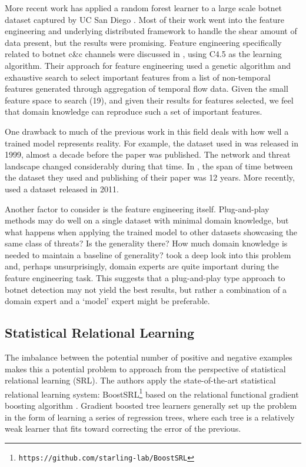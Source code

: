\documentclass[letterpaper]{article}
\begin{document}
More recent work has applied a random forest learner to a large scale botnet dataset captured by UC San Diego \cite{SINGH2014488}.  Most of their work went into the feature engineering and underlying distributed framework to handle the shear amount of data present, but the results were promising.  Feature engineering specifically related to botnet c\&c channels were discussed in \cite{7891834}, using C4.5 as the learning algorithm.  Their approach for feature engineering used a genetic algorithm and exhaustive search to select important features from a list of non-temporal features generated through aggregation of temporal flow data.  Given the small feature space to search (19), and given their results for features selected, we feel that domain knowledge can reproduce such a set of important features.

One drawback to much of the previous work in this field deals with how well a trained model represents reality.  For example, the dataset used in \cite{Zhang:2008:RNI:2220436.2221144} was released in 1999, almost a decade before the paper was published.  The network and threat landscape changed considerably during that time.  In \cite{Xu:2010:IDU:1946417.1946434}, the span of time between the dataset they used and publishing of their paper was 12 years.  More recently, \cite{7891834} used a dataset released in 2011.

Another factor to consider is the feature engineering itself.  Plug-and-play methods may do well on a single dataset with minimal domain knowledge, but what happens when applying the trained model to other datasets showcasing the same class of threats?  Is the generality there?  How much domain knowledge is needed to maintain a baseline of generality?  \cite{BENASHER201551} took a deep look into this problem and, perhaps unsurprisingly, domain experts are quite important during the feature engineering task.  This suggests that a plug-and-play type approach to botnet detection may not yield the best results, but rather a combination of a domain expert and a `model' expert might be preferable.

\subsection{Statistical Relational Learning}

The imbalance between the potential number of positive and negative examples makes this a potential problem to approach from the perspective of statistical relational learning (SRL).  The authors apply the state-of-the-art statistical relational learning system: BoostSRL\footnote{\texttt{https://github.com/starling-lab/BoostSRL}} based on the relational functional gradient boosting algorithm \cite{natarajan2015boosted}.  Gradient boosted tree learners generally set up the problem in the form of learning a series of regression trees, where each tree is a relatively weak learner that fits toward correcting the error of the previous.
\end{document}
